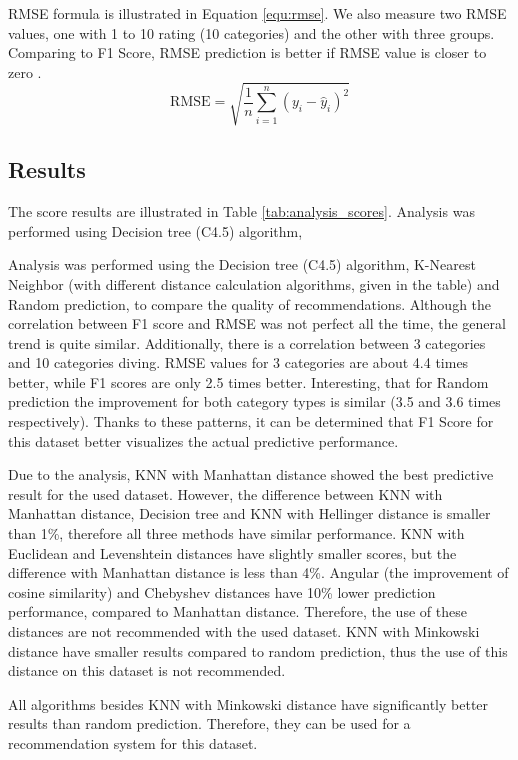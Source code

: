 RMSE formula is illustrated in Equation \eqref{equ:rmse}. We also measure two RMSE values, one with 1 to 10 rating (10 categories) and the other with three groups. Comparing to F1 Score, RMSE prediction is better if RMSE value is closer to zero \cite{RMSE}.
\begin{equation}
    \text{RMSE} = \sqrt{\frac{1}{n} \sum_{i=1}^n (y_i - \hat{y}_i)^2}\label{equ:rmse}
\end{equation}
\subsection{Results}
The score results are illustrated in Table \ref{tab:analysis_scores}. Analysis was performed using Decision tree (C4.5) algorithm, 

Analysis was performed using the Decision tree (C4.5) algorithm, K-Nearest Neighbor (with different distance calculation algorithms, given in the table) and Random prediction, to compare the quality of recommendations. Although the correlation between F1 score and RMSE was not perfect all the time, the general trend is quite similar. Additionally, there is a correlation between 3 categories and 10 categories diving. RMSE values for 3 categories are about 4.4 times better, while F1 scores are only 2.5 times better. Interesting, that for Random prediction the improvement for both category types is similar (3.5 and 3.6 times respectively). Thanks to these patterns, it can be determined that F1 Score for this dataset better visualizes the actual predictive performance.

Due to the analysis, KNN with Manhattan distance showed the best predictive result for the used dataset. However, the difference between KNN with Manhattan distance, Decision tree and KNN with Hellinger distance is smaller than 1\%, therefore all three methods have similar performance. KNN with Euclidean and Levenshtein distances have slightly smaller scores, but the difference with Manhattan distance is less than 4\%. Angular (the improvement of cosine similarity) and Chebyshev distances have 10\% lower prediction performance, compared to Manhattan distance. Therefore, the use of these distances are not recommended with the used dataset. KNN with Minkowski distance have smaller results compared to random prediction, thus the use of this distance on this dataset is not recommended.

All algorithms besides KNN with Minkowski distance have significantly better results than random prediction. Therefore, they can be used for a recommendation system for this dataset.


